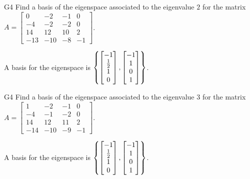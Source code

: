 \begin{problem}{G4}
Find a basis of the eigenspace associated to the eigenvalue $2$ for the matrix $A=\begin{bmatrix}0 & -2 & -1 & 0 \\ -4 & -2 & -2 & 0 \\ 14 & 12 & 10 & 2 \\ -13 & -10 & -8 & -1 \end{bmatrix}$.
\end{problem}
\begin{solution}
A basis for the eigenspace is  $\left\{\begin{bmatrix} -1 \\ \frac{1}{2} \\ 1 \\ 0 \end{bmatrix},\begin{bmatrix} -1 \\ 1 \\ 0 \\ 1 \end{bmatrix}\right\}$.
\end{solution}

\begin{problem}{G4}
Find a basis of the eigenspace associated to the eigenvalue $3$ for the matrix $A=\begin{bmatrix}1 & -2 & -1 & 0 \\ -4 & -1 & -2 & 0 \\ 14 & 12 & 11 & 2 \\ -14 & -10 & -9 & -1\end{bmatrix}$.
\end{problem}
\begin{solution}
A basis for the eigenspace is  $\left\{\begin{bmatrix} -1 \\ \frac{1}{2} \\ 1 \\ 0 \end{bmatrix},\begin{bmatrix} -1 \\ 1 \\ 0 \\ 1 \end{bmatrix}\right\}$.
\end{solution}



